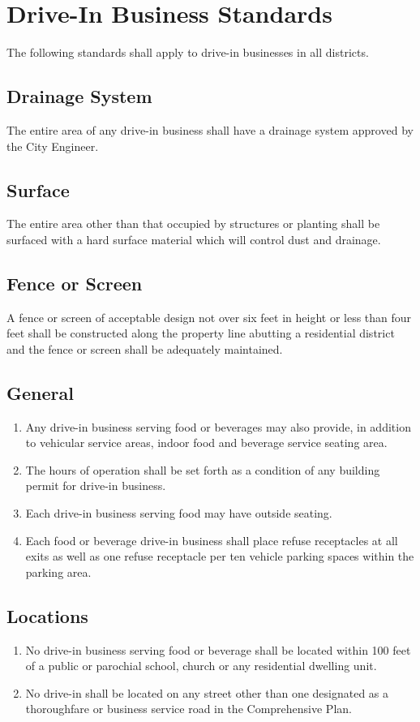 \section{Drive-In Business Standards}
The following standards shall apply to drive-in businesses in all districts.
\subsection{Drainage System}
The entire area of any drive-in business shall have a drainage system approved by the City Engineer.
\subsection{Surface}
The entire area other than that occupied by structures or planting shall be surfaced with a hard surface material which will control dust and drainage.
\subsection{Fence or Screen}
A fence or screen of acceptable design not over six feet in height or less than four feet shall be constructed along the property line abutting a residential district and the fence or screen shall be adequately maintained.
\subsection{General}
\begin{enumerate}[{\indent}1)]
    \item Any drive-in business serving food or beverages may also provide, in addition to vehicular service areas, indoor food and beverage service seating area.
    \item The hours of operation shall be set forth as a condition of any building permit for drive-in business.
    \item Each drive-in business serving food may have outside seating.
    \item Each food or beverage drive-in business shall place refuse receptacles at all exits as well as one refuse receptacle per ten vehicle parking spaces within the parking area.
\end{enumerate}
\subsection{Locations}
\begin{enumerate}[{\indent}1)]
    \item No drive-in business serving food or beverage shall be located within 100 feet of a public or parochial school, church or any residential dwelling unit.
    \item No drive-in shall be located on any street other than one designated as a thoroughfare or business service road in the Comprehensive Plan.
\end{enumerate}
